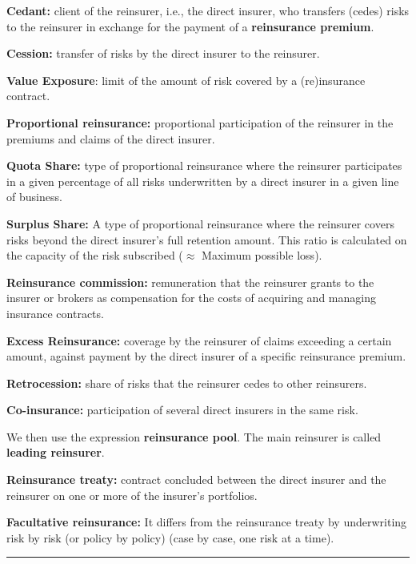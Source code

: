 
\begin{f}

\textbf{Cedant:} client of the reinsurer, i.e., the direct insurer, who transfers (cedes) risks to the reinsurer in exchange for the payment
of a \textbf{reinsurance premium}.

\textbf{Cession:} transfer of risks by the direct insurer to the reinsurer.

\textbf{Value Exposure}: limit of the amount of risk covered by a (re)insurance contract.

\textbf{Proportional reinsurance:} proportional participation of the reinsurer in the premiums and claims of the direct insurer.

\textbf{Quota Share:} type of proportional reinsurance where the reinsurer participates in a given percentage of all risks underwritten by a direct insurer in a given line of business.

\textbf{Surplus Share:} A type of proportional reinsurance where the reinsurer covers risks beyond the direct insurer's 
full retention amount. This ratio is calculated on the capacity of the risk subscribed (\(\approx\) Maximum possible loss).

\textbf{Reinsurance commission:} remuneration that the reinsurer grants to the insurer or brokers as compensation for the costs of acquiring and managing insurance contracts.

\textbf{Excess Reinsurance:}
 coverage by the reinsurer of claims exceeding a certain amount, against payment by the direct insurer of a specific reinsurance premium.

\textbf{Retrocession:}  share of risks that the reinsurer cedes to other reinsurers.

\textbf{Co-insurance:} participation of several direct insurers in the same risk.

We then use the expression \textbf{reinsurance pool}.
The main reinsurer is called \textbf{leading reinsurer}.

\textbf{Reinsurance treaty:} contract concluded between the direct insurer and the reinsurer on one or more of the insurer's portfolios.

\textbf{Facultative reinsurance:}
It differs from the reinsurance treaty by underwriting risk by risk (or policy by policy) (case by case, one risk at a time).

\end{f}
\hrule




